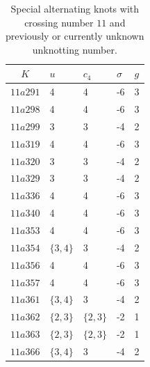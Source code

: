 \documentclass[a4paper,11pt]{amsart}
\theoremstyle{definition}
\theoremstyle{remark}
\numberwithin{equation}{section}
\begin{document}
\begin{table}[ht]
\vspace{.2cm}
    \centering
    \begin{tabular}{|c|Y|Y|Y|Y|}
        \hline
        $K$ & $u$ & $c_4$ & $\sigma$ & $g$ \\ \hline
        $11a291$ & 4 & 4 & -6 & 3\\
        $11a298$ & 4 & 4 & -6 & 3\\
        $11a299$ & 3 & 3 & -4 & 2 \\
        $11a319$ & 4 & 4 & -6 & 3\\
        $11a320$ & 3 & 3 & -4 & 2\\
        $11a329$ & 3 & 3 & -4 & 2\\
        $11a336$ & 4 & 4 & -6 & 3\\
        $11a340$ & 4 & 4 & -6 & 3\\
        $11a353$ & 4 & 4 & -6 & 3\\
        $11a354$ & $\{3,4\}$ & 3 & -4 & 2\\
        $11a356$ & 4 & 4 & -6 & 3\\
        $11a357$ & 4 & 4 & -6 & 3\\
        $11a361$ & $\{3,4\}$ & 3 & -4 & 2\\
        $11a362$ & $\{2,3\}$ & $\{2,3\}$ & -2 & 1\\
        $11a363$ & $\{2,3\}$ & $\{2,3\}$ & -2 & 1\\
        $11a366$ & $\{3,4\}$ & 3 & -4 & 2\\ \hline
    \end{tabular}
    \vspace{.4cm}
    \caption{Special alternating knots with crossing number $11$ and previously or currently unknown unknotting number.}
    \label{tab:newvalues}
\end{table}
\vspace{-.7cm}
\end{document}
